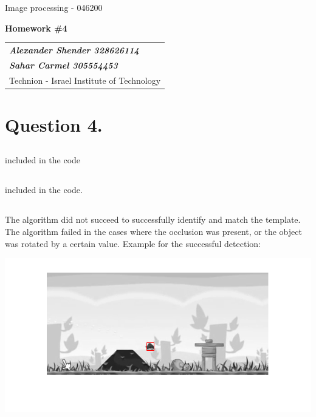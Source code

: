 \documentclass[a4paper]{iacas}
\begin{document}
\begin{center}
 \large Image processing - 046200
 \end{center}
\begin{center}
\large\textbf{Homework \#4}
 \end{center}


\begin{tabular}{l}
\\
{\bf\textit{Alexander Shender 328626114}} \\
{\bf\textit{Sahar Carmel 305554453}} \\
Technion - Israel Institute of Technology
\end{tabular}


\newpage
\section{Question 4.}
\subsection{}
included in the code

\subsection{}
included in the code.


\subsection{}
The algorithm did not succeed to successfully identify and match the template. The algorithm failed in the cases where the occlusion was present, or the object was rotated by a certain value. 
\newline
Example for the successful detection:

\vskip 0.1in
\begin{minipage}{0.5\textwidth}
\centering
	\includegraphics[scale=0.8]{output/q4/algo_1/successful.png}
\end{minipage}
\vskip 0.1in
\end{document}
